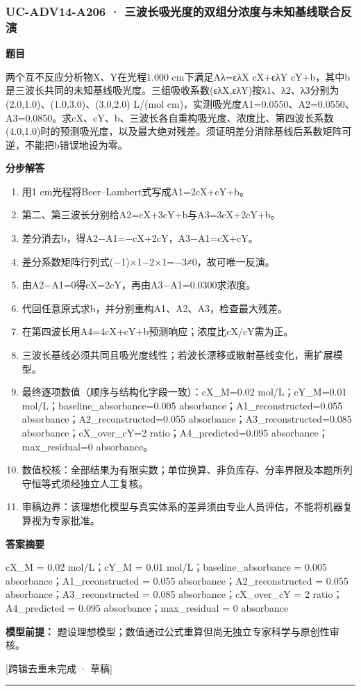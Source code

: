 \documentclass[UTF8,11pt,a4paper]{ctexart}
\begin{document}
\subsubsection*{UC-ADV14-A206 · 三波长吸光度的双组分浓度与未知基线联合反演}
\noindent\textbf{题目}\par
两个互不反应分析物X、Y在光程1.000 cm下满足Aλ=ελX cX+ελY cY+b，其中b是三波长共同的未知基线吸光度。三组吸收系数(ελX,ελY)按λ1、λ2、λ3分别为(2.0,1.0)、(1.0,3.0)、(3.0,2.0) L/(mol cm)，实测吸光度A1=0.0550、A2=0.0550、A3=0.0850。求cX、cY、b、三波长各自重构吸光度、浓度比、第四波长系数(4.0,1.0)时的预测吸光度，以及最大绝对残差。须证明差分消除基线后系数矩阵可逆，不能把b错误地设为零。\par
\medskip\noindent\textbf{分步解答}
\begin{enumerate}
\item 用1 cm光程将Beer–Lambert式写成A1=2cX+cY+b。
\item 第二、第三波长分别给A2=cX+3cY+b与A3=3cX+2cY+b。
\item 差分消去b，得A2−A1=−cX+2cY，A3−A1=cX+cY。
\item 差分系数矩阵行列式(−1)×1−2×1=−3≠0，故可唯一反演。
\item 由A2−A1=0得cX=2cY，再由A3−A1=0.0300求浓度。
\item 代回任意原式求b，并分别重构A1、A2、A3，检查最大残差。
\item 在第四波长用A4=4cX+cY+b预测响应；浓度比cX/cY需为正。
\item 三波长基线必须共同且吸光度线性；若波长漂移或散射基线变化，需扩展模型。
\item 最终逐项数值（顺序与结构化字段一致）：cX\_M=0.02 mol/L；cY\_M=0.01 mol/L；baseline\_absorbance=0.005 absorbance；A1\_reconstructed=0.055 absorbance；A2\_reconstructed=0.055 absorbance；A3\_reconstructed=0.085 absorbance；cX\_over\_cY=2 ratio；A4\_predicted=0.095 absorbance；max\_residual=0 absorbance。
\item 数值校核：全部结果为有限实数；单位换算、非负库存、分率界限及本题所列守恒等式须经独立人工复核。
\item 审稿边界：该理想化模型与真实体系的差异须由专业人员评估，不能将机器复算视为专家批准。
\end{enumerate}
\noindent\textbf{答案摘要}\par
cX\_M = 0.02 mol/L；cY\_M = 0.01 mol/L；baseline\_absorbance = 0.005 absorbance；A1\_reconstructed = 0.055 absorbance；A2\_reconstructed = 0.055 absorbance；A3\_reconstructed = 0.085 absorbance；cX\_over\_cY = 2 ratio；A4\_predicted = 0.095 absorbance；max\_residual = 0 absorbance\par
\noindent\textbf{模型前提：}
题设理想模型；数值通过公式重算但尚无独立专家科学与原创性审核。\par
\noindent\textcolor{red!65!black}{[跨辑去重未完成 · 草稿]} \par
\medskip\hrule\medskip
{}
\end{document}
